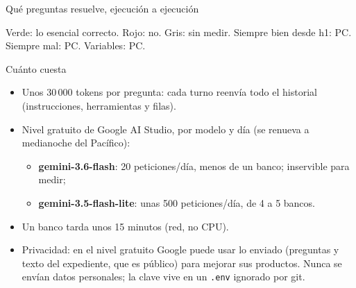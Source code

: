 \documentclass[aspectratio=169,10pt]{beamer}
\newcommand{\ttt}[1]{\texttt{\small #1}}
\begin{document}
\begin{frame}{Qué preguntas resuelve, ejecución a ejecución}
\centering
{}

\footnotesize Verde: lo esencial correcto. Rojo: no. Gris: sin medir. Siempre bien desde h1: PC\pcSiempreBien.
Siempre mal: PC\pcSiempreMal. Variables: PC\pcVariables.
\end{frame}

\begin{frame}{Cuánto cuesta}
\begin{itemize}
\item Unos \alert{30\,000 tokens por pregunta}: cada turno reenvía todo el historial (instrucciones, herramientas y filas).
\item Nivel gratuito de Google AI Studio, por modelo y día (se renueva a medianoche del Pacífico):
  \begin{itemize}\small
  \item \textbf{gemini-3.6-flash}: 20 peticiones/día, menos de un banco; inservible para medir;
  \item \textbf{gemini-3.5-flash-lite}: unas 500 peticiones/día, de 4 a 5 bancos.
  \end{itemize}
\item Un banco tarda unos 15 minutos (red, no CPU).
\item \alert{Privacidad}: en el nivel gratuito Google puede usar lo enviado (preguntas y texto del expediente, que es
      público) para mejorar sus productos. Nunca se envían datos personales; la clave vive en un \ttt{.env} ignorado
      por git.
\end{itemize}
\end{frame}
\end{document}
